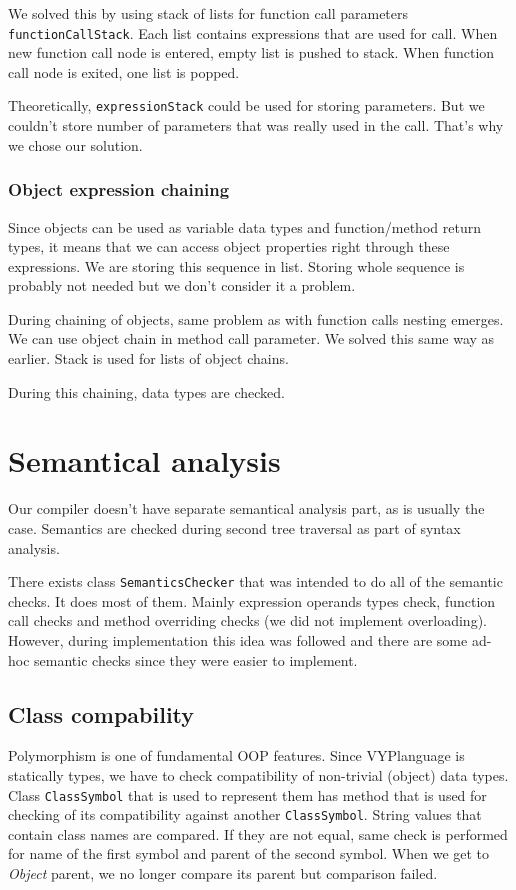 \documentclass[a4paper, 11pt]{article}
\begin{document}
We solved this by using stack of lists for function call parameters \texttt{functionCallStack}. Each list contains expressions that are used for call. When new function call node is entered, empty list is pushed to stack. When function call node is exited, one list is popped.

Theoretically, \texttt{expressionStack} could be used for storing parameters. But we couldn't store number of parameters that was really used in the call. That's why we chose our solution.

\subsubsection*{Object expression chaining}
Since objects can be used as variable data types and function/method return types, it means that we can access object properties right through these expressions. We are storing this sequence in list. Storing whole sequence is probably not needed but we don't consider it a problem.

During chaining of objects, same problem as with function calls nesting emerges. We can use object chain in method call parameter. We solved this same way as earlier. Stack is used for lists of object chains.

During this chaining, data types are checked.


\section{Semantical analysis}
Our compiler doesn't have separate semantical analysis part, as is usually the case. Semantics are checked during second tree traversal as part of syntax analysis.

There exists class \texttt{SemanticsChecker} that was intended to do all of the semantic checks. It does most of them. Mainly expression operands types check, function call checks and method overriding checks (we did not implement overloading). However, during implementation this idea was followed and there are some ad-hoc semantic checks since they were easier to implement.

\subsection*{Class compability}
Polymorphism is one of fundamental OOP features. Since VYPlanguage is statically types, we have to check compatibility of non-trivial (object) data types. Class \texttt{ClassSymbol} that is used to represent them has method that is used for checking of its compatibility against another \texttt{ClassSymbol}. String values that contain class names are compared. If they are not equal, same check is performed for name of the first symbol and parent of the second symbol. When we get to \textit{Object} parent, we no longer compare its parent but comparison failed.
\end{document}
